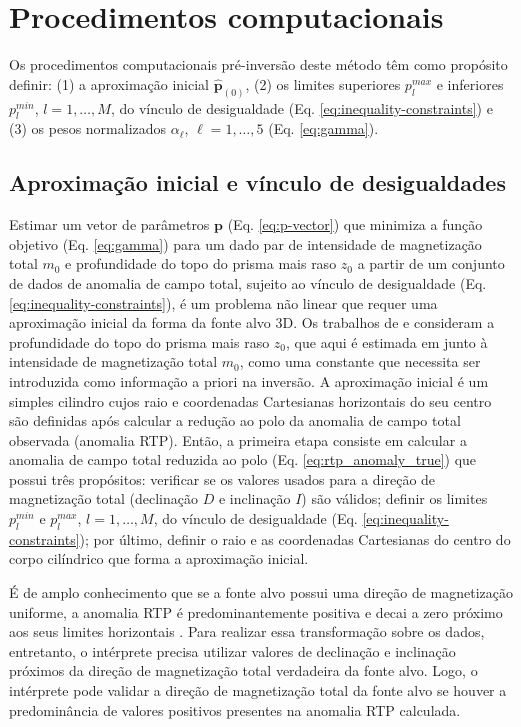 \chapter{Procedimentos computacionais}

Os procedimentos computacionais pré-inversão deste método têm como propósito definir: (1) a aproximação inicial $ \hat{\mathbf{p}}_{(0)} $, (2) os limites superiores $ p_l^{max} $ e inferiores $ p_l^{min} $, $ l=1, \dots, M $, do vínculo de desigualdade (Eq. \ref{eq:inequality-constraints}) e (3) os pesos normalizados $ \alpha_{\ell} $, $ \ell=1,\dots,5 $ (Eq. \ref{eq:gamma}). 

\section{Aproximação inicial e vínculo de desigualdades}

Estimar um vetor de parâmetros $\mathbf{p}$ (Eq. \ref{eq:p-vector}) que minimiza a função objetivo (Eq. \ref{eq:gamma}) para um dado par de intensidade de magnetização total $ m_0 $ e profundidade do topo do prisma mais raso $ z_0 $ a partir de um conjunto de dados de anomalia de campo total, sujeito ao vínculo de desigualdade (Eq. \ref{eq:inequality-constraints}), é um problema não linear que requer uma aproximação inicial da forma da fonte alvo 3D. 
Os trabalhos de \cite{oliveirajr_etal2011} e \cite{oliveirajr_barbosa2013} consideram a profundidade do topo do prisma mais raso $ z_0 $, que aqui é estimada em junto à intensidade de magnetização total $ m_0 $, como uma constante que necessita ser introduzida como informação a priori na inversão.
A aproximação inicial é um simples cilindro cujos raio e coordenadas Cartesianas horizontais do seu centro são definidas após calcular a redução ao polo da anomalia de campo total observada (anomalia RTP).
Então, a primeira etapa consiste em calcular a anomalia de campo total reduzida ao polo (Eq. \ref{eq:rtp_anomaly_true}) que possui três propósitos: verificar se os valores usados para a direção de magnetização total (declinação $D$ e inclinação $I$) são válidos; definir os limites $p_{l}^{min}$ e $p_{l}^{max}$, $ l=1, \dots, M $, do vínculo de desigualdade (Eq. \ref{eq:inequality-constraints}); por último, definir o raio e as coordenadas Cartesianas do centro do corpo cilíndrico que forma a aproximação inicial.

É de amplo conhecimento que se a fonte alvo possui uma direção de magnetização uniforme, a anomalia RTP é predominantemente positiva e decai a zero próximo aos seus limites horizontais \cite[por exemplo,][p. 331]{blakely1996}.
Para realizar essa transformação sobre os dados, entretanto, o intérprete precisa utilizar valores de declinação e inclinação próximos da direção de magnetização total verdadeira da fonte alvo.
Logo, o intérprete pode validar a direção de magnetização total da fonte alvo se houver a predominância de valores positivos presentes na anomalia RTP calculada.

